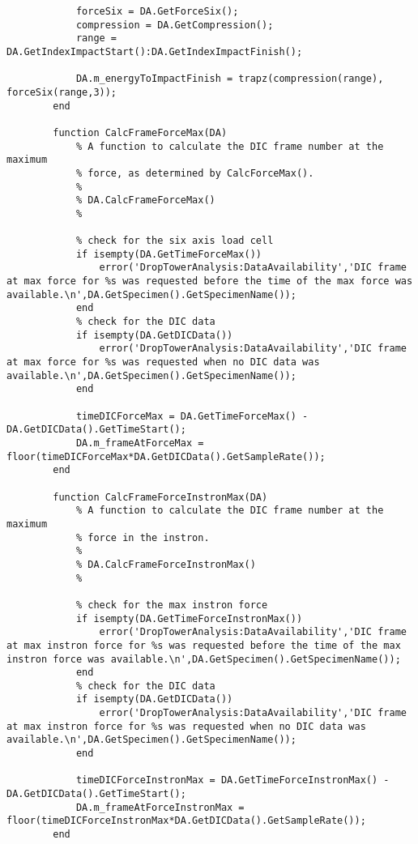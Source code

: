 \begin{lstlisting}
            forceSix = DA.GetForceSix();
            compression = DA.GetCompression();
            range = DA.GetIndexImpactStart():DA.GetIndexImpactFinish();
            
            DA.m_energyToImpactFinish = trapz(compression(range), forceSix(range,3));
        end
        
        function CalcFrameForceMax(DA)
            % A function to calculate the DIC frame number at the maximum
            % force, as determined by CalcForceMax().
            %
            % DA.CalcFrameForceMax()
            %
            
            % check for the six axis load cell
            if isempty(DA.GetTimeForceMax())
                error('DropTowerAnalysis:DataAvailability','DIC frame at max force for %s was requested before the time of the max force was available.\n',DA.GetSpecimen().GetSpecimenName());
            end
            % check for the DIC data
            if isempty(DA.GetDICData())
                error('DropTowerAnalysis:DataAvailability','DIC frame at max force for %s was requested when no DIC data was available.\n',DA.GetSpecimen().GetSpecimenName());
            end
            
            timeDICForceMax = DA.GetTimeForceMax() - DA.GetDICData().GetTimeStart();
            DA.m_frameAtForceMax = floor(timeDICForceMax*DA.GetDICData().GetSampleRate());
        end
        
        function CalcFrameForceInstronMax(DA)
            % A function to calculate the DIC frame number at the maximum
            % force in the instron.
            %
            % DA.CalcFrameForceInstronMax()
            %
            
            % check for the max instron force
            if isempty(DA.GetTimeForceInstronMax())
                error('DropTowerAnalysis:DataAvailability','DIC frame at max instron force for %s was requested before the time of the max instron force was available.\n',DA.GetSpecimen().GetSpecimenName());
            end
            % check for the DIC data
            if isempty(DA.GetDICData())
                error('DropTowerAnalysis:DataAvailability','DIC frame at max instron force for %s was requested when no DIC data was available.\n',DA.GetSpecimen().GetSpecimenName());
            end
            
            timeDICForceInstronMax = DA.GetTimeForceInstronMax() - DA.GetDICData().GetTimeStart();
            DA.m_frameAtForceInstronMax = floor(timeDICForceInstronMax*DA.GetDICData().GetSampleRate());
        end
        

\end{lstlisting}
